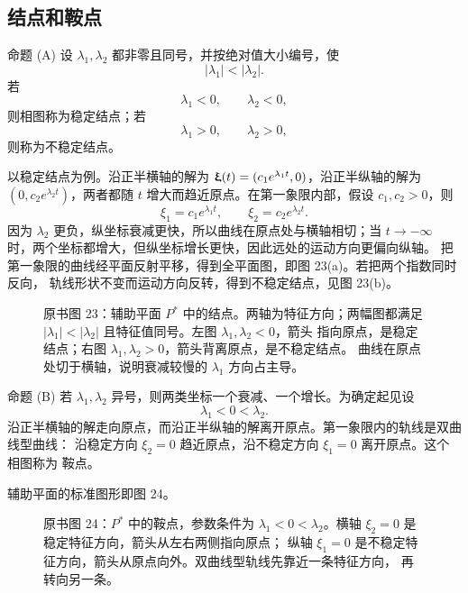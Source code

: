 \subsection*{结点和鞍点}

\begin{sourceitem}{命题 (A)}
设 \(\lambda_1,\lambda_2\) 都非零且同号，并按绝对值大小编号，使
\begin{equation}
 |\lambda_1|<|\lambda_2|.
 \tag{10}
\end{equation}
若
\[
 \lambda_1<0,\qquad\lambda_2<0,
\]
则相图称为稳定结点；若
\[
 \lambda_1>0,\qquad\lambda_2>0,
\]
则称为不稳定结点。
\end{sourceitem}

以稳定结点为例。沿正半横轴的解为
\(\vect{\xi}(t)=(c_1e^{\lambda_1t},0)\)，沿正半纵轴的解为
\((0,c_2e^{\lambda_2t})\)，两者都随 \(t\) 增大而趋近原点。在第一象限内部，假设
\(c_1,c_2>0\)，则
\[
 \xi_1=c_1e^{\lambda_1t},\qquad
 \xi_2=c_2e^{\lambda_2t}.
\]
因为 \(\lambda_2\) 更负，纵坐标衰减更快，所以曲线在原点处与横轴相切；当
\(t\to-\infty\) 时，两个坐标都增大，但纵坐标增长更快，因此远处的运动方向更偏向纵轴。
把第一象限的曲线经平面反射平移，得到全平面图，即图 23(a)。若把两个指数同时反向，
轨线形状不变而运动方向反转，得到不稳定结点，见图 23(b)。

\begin{figure}[H]
 \centering
 
 \caption{原书图 23：辅助平面 \(P^*\) 中的结点。两轴为特征方向；两幅图都满足
 \(|\lambda_1|<|\lambda_2|\) 且特征值同号。左图 \(\lambda_1,\lambda_2<0\)，箭头
 指向原点，是稳定结点；右图 \(\lambda_1,\lambda_2>0\)，箭头背离原点，是不稳定结点。
 曲线在原点处切于横轴，说明衰减较慢的 \(\lambda_1\) 方向占主导。}
 \label{fig:ch2-p2-23}
\end{figure}

\begin{sourceitem}{命题 (B)}
若 \(\lambda_1,\lambda_2\) 异号，则两类坐标一个衰减、一个增长。为确定起见设
\begin{equation}
 \lambda_1<0<\lambda_2.
 \tag{11}
\end{equation}
沿正半横轴的解走向原点，而沿正半纵轴的解离开原点。第一象限内的轨线是双曲线型曲线：
沿稳定方向 \(\xi_2=0\) 趋近原点，沿不稳定方向 \(\xi_1=0\) 离开原点。这个相图称为
鞍点。
\end{sourceitem}

辅助平面的标准图形即图 24。

\begin{figure}[H]
 \centering
 
 \caption{原书图 24：\(P^*\) 中的鞍点，参数条件为
 \(\lambda_1<0<\lambda_2\)。横轴 \(\xi_2=0\) 是稳定特征方向，箭头从左右两侧指向原点；
 纵轴 \(\xi_1=0\) 是不稳定特征方向，箭头从原点向外。双曲线型轨线先靠近一条特征方向，
 再转向另一条。}
 \label{fig:ch2-p2-24}
\end{figure}

